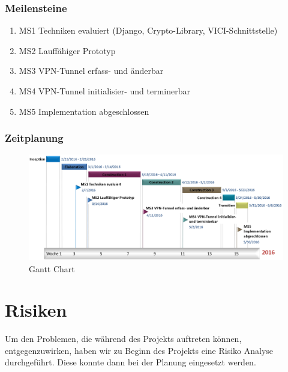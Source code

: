 \begin{landscape}
\subsubsection{Meilensteine}
\begin{enumerate}
	\item MS1 Techniken evaluiert (Django, Crypto-Library, VICI-Schnittstelle)
	\item MS2 Lauffähiger Prototyp
	\item MS3 VPN-Tunnel erfass- und änderbar
	\item MS4 VPN-Tunnel initialisier- und terminerbar
	\item MS5 Implementation abgeschlossen
\end{enumerate}
\subsubsection{Zeitplanung}
	\begin{figure}[H]
		\centering
		\includegraphics[width=220mm]{images/gantt_new.PNG}
		\caption{Gantt Chart}
	\end{figure}
\newpage
\section{Risiken}
Um den Problemen, die während des Projekts auftreten können, entgegenzuwirken, haben wir zu Beginn des Projekts eine Risiko Analyse durchgeführt. Diese konnte dann bei der Planung eingesetzt werden.


\end{landscape}
